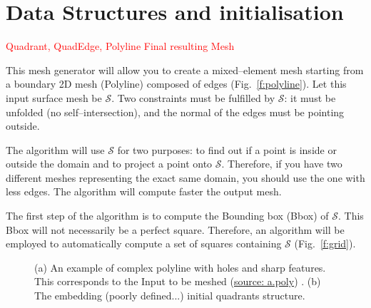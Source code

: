 \documentclass[10pt]{article}
\begin{document}
\tableofcontents
\newpage
\section{Data Structures and initialisation}
\label{sec:dataStruct}

\textcolor{red}{Quadrant, QuadEdge, Polyline}
\textcolor{red}{Final resulting Mesh}


This mesh generator will allow you to create a mixed--element mesh starting from a boundary 2D mesh  (Polyline) composed of edges (Fig.~\ref{f:polyline}). Let this input surface mesh be $\mathcal{S}$. Two constraints must be fulfilled by $\mathcal{S}$: it must be unfolded (no self--intersection), and the normal of the edges must be pointing outside.

The algorithm will use $\mathcal{S}$ for two purposes: to find out if a point is inside or outside the domain and to project a point onto $\mathcal{S}$. Therefore, if you have two different meshes representing the exact same domain, you should use the one with less edges. The algorithm will compute faster the output mesh.

The first step of the algorithm is to compute the Bounding box (Bbox) of $\mathcal{S}$. This Bbox will not necessarily be a perfect square. Therefore, an algorithm will be employed to automatically compute a set of squares containing $\mathcal{S}$ (Fig.~\ref{f:grid}).

 \begin{figure}[htb]
\centering
\caption{ (a) An example of complex polyline with holes and sharp features. This corresponds to the Input to be meshed (\href{https://github.com/jaillet/MixedQuadTree/blob/master/data/a.poly}{source: a.poly}) . (b) The embedding (poorly defined...) initial quadrants structure. }
\label{fig:boundary}
\end{figure}
\end{document}
